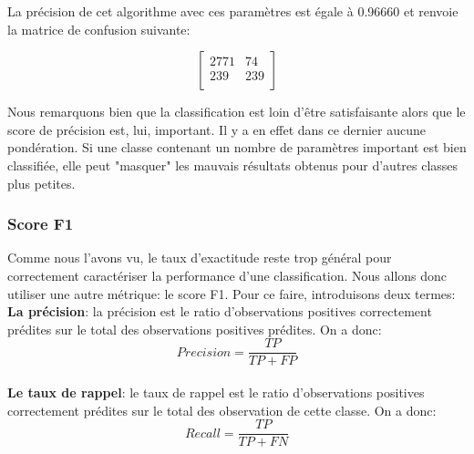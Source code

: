 \documentclass[a4paper]{report}
\begin{document}
\begin{center}
\noindent
{}
\end{center}
\medbreak

La précision de cet algorithme avec ces paramètres est égale à 0.96660 et renvoie la matrice de confusion suivante:

$$\begin{bmatrix}
2771 & 74 \\ 
239 & 239 \\
\end{bmatrix}$$

\medskip
Nous remarquons bien que la classification est loin d'être satisfaisante alors que le score de précision est, lui, important. Il y a en effet dans ce dernier aucune pondération. Si une classe contenant un nombre de paramètres important est bien classifiée, elle peut "masquer" les mauvais résultats obtenus pour d'autres classes plus petites.

\subsubsection{Score F1}
Comme nous l’avons vu, le taux d’exactitude reste trop général pour correctement caractériser la performance d’une classification. Nous allons donc utiliser une autre métrique: le score F1. Pour ce faire, introduisons deux termes:\\

\medskip
\textbf{La précision}: la précision est le ratio d’observations positives correctement prédites sur le total des observations positives prédites. On a donc:
\begin{equation}
	Precision = \dfrac{TP}{TP+FP}
\end{equation}\\

\bigskip
\textbf{Le taux de rappel}: le taux de rappel est le ratio d’observations positives correctement prédites sur le total des observation de cette classe. On a donc:\\
\begin{equation}
	Recall = \dfrac{TP}{TP+FN}
\end{equation}
\\
\end{document}
